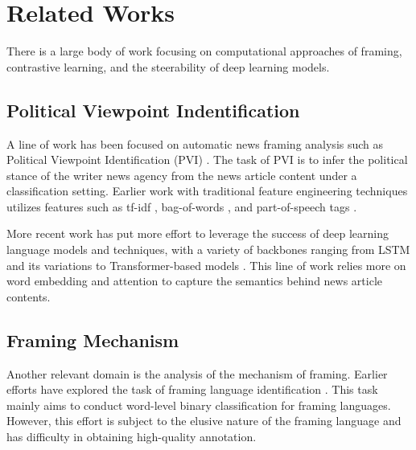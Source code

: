 \chapter{Related Works}

There is a large body of work focusing on computational approaches of framing, contrastive learning, and the steerability of deep learning models.

\section{Political Viewpoint Indentification}
A line of work has been focused on automatic news framing analysis such as Political Viewpoint Identification (PVI) \cite{PVI-survey,li-goldwasser-2021-using,kim-johnson-2022-close,matero-etal-2021-melt-message,li-caragea-2021-multi,yu2008classify,hoyland-etal-2014-predicting,biessmann2016pvi,duthie2016mining,baly-etal-2019-multi,li2017pvi-lstm,rao2016pvi-lstm,gangula-etal-2019-detecting,kummervold-etal-2021-operationalizing,baly-etal-2020-detect,luo-etal-2020-detecting}. The task of PVI is to infer the political stance of the writer news agency from the news article content under a classification setting. Earlier work with traditional feature engineering techniques utilizes features such as tf-idf \cite{yu2008classify}, bag-of-words \cite{yu2008classify,hoyland-etal-2014-predicting,biessmann2016pvi}, and part-of-speech tags \cite{hoyland-etal-2014-predicting,duthie2016mining,baly-etal-2019-multi}.

More recent work has put more effort to leverage the success of deep learning language models and techniques, with a variety of backbones ranging from LSTM and its variations \cite{li2017pvi-lstm,rao2016pvi-lstm,gangula-etal-2019-detecting} to Transformer-based models \cite{kummervold-etal-2021-operationalizing,baly-etal-2020-detect,luo-etal-2020-detecting}. This line of work relies more on word embedding and attention to capture the semantics behind news article contents.


\section{Framing Mechanism}
Another relevant domain is the analysis of the mechanism of framing. Earlier efforts have explored the task of framing language identification \cite{hamborg2020media,drakulich2015explicit,sap2019social,baumer-etal-2015-testing}. This task mainly aims to conduct word-level binary classification for framing languages. However, this effort is subject to the elusive nature of the framing language and has difficulty in obtaining high-quality annotation.

